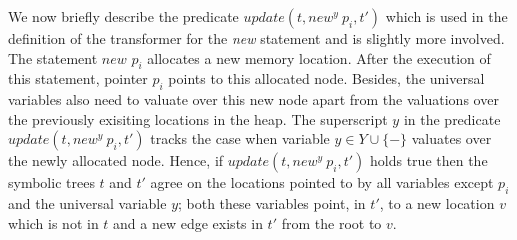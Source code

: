 \documentclass{llncs}
\begin{document}
We now briefly describe the predicate $update(t, new^y~p_i, t')$ which is used in the definition of the transformer for the \textit{new} statement and is slightly more involved.
The statement $\textit{new } p_i$ allocates a new memory location. After the execution of this statement, pointer $p_i$ points to this allocated node. Besides, the universal variables also need to valuate over this new node apart from the valuations over the previously exisiting locations in the heap.
The superscript $y$ in the predicate $update(t, new^y~p_i, t')$ tracks the case when variable $y \in Y \cup \{-\}$ valuates over the newly allocated node.
Hence, if $update(t, new^y~p_i, t')$ holds true then the symbolic trees $t$ and $t'$ agree on the locations pointed to by all variables except $p_i$ and the universal variable $y$; both these variables point, in $t'$, to a new location $v$ which is not in $t$ and a new edge exists in $t'$ from the root to $v$.
\end{document}
